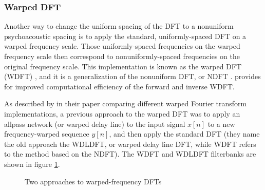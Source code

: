 \documentclass[letter,12pt,notitlepage]{article}
\begin{document}
\subsubsection{Warped DFT}

Another way to change the uniform spacing of the DFT to a nonuniform psychoacoustic spacing is to apply the standard, uniformly-spaced DFT on a warped frequency scale. Those uniformly-spaced frequencies on the warped frequency scale then correspond to nonuniformly-spaced frequencies on the original frequency scale. This implementation is known as the warped DFT (WDFT) \cite{warped1}, and it is a generalization of the nonuniform DFT, or NDFT \cite{nufft3}. \citet{warped2} provides for improved computational efficiency of the forward and inverse WDFT.

As described by \citet{warpedcomparison} in their paper comparing different warped Fourier transform implementations, a previous approach to the warped DFT \cite{earlywarped1, earlywarped2} was to apply an allpass network (or warped delay line) to the input signal $x[n]$ to a new frequency-warped sequence $y[n]$, and then apply the standard DFT (they name the old approach the WDLDFT, or warped delay line DFT, while WDFT refers to the method based on the NDFT). The WDFT and WDLDFT filterbanks are shown in figure \ref{fig:wdfts}.

\begin{figure}[ht]
	\centering
	\caption{Two approaches to warped-frequency DFTs}
	\label{fig:wdfts}
\end{figure}
\end{document}
